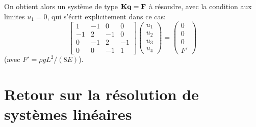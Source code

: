 %
On obtient alors un système de type $\mathbf{K}\mathbf{q}=\mathbf{F}$ à résoudre, avec la condition aux limites $u_1=0$, qui s'écrit explicitement dans ce cas:
\begin{equation}
\begin{bmatrix} 1 & -1 & 0 & 0 \\ -1 & 2 & -1 & 0 \\ 0 & -1 & 2 & -1\\ 0&0&-1&1
\end{bmatrix}
\begin{pmatrix} u_1\\u_2\\u_3\\u_4 \end{pmatrix}
=
\begin{pmatrix} 0\\0\\0\\F' \end{pmatrix}
\end{equation}
(avec $F'=\rho g L^2/(8E)$).

\medskipvm
\ifVersionAvecExemplesSepares
   \section{Retour sur la résolution de systèmes linéaires}
\else
